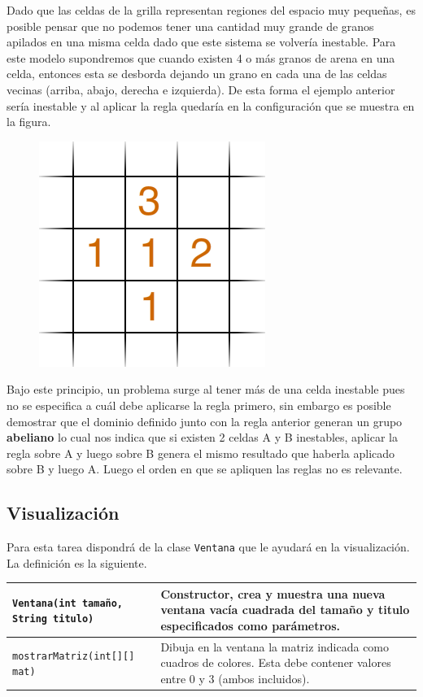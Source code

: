 \documentclass[dcc]{fcfmcourse}
\begin{document}
Dado que las celdas de la grilla representan regiones del espacio muy pequeñas, es posible pensar que no podemos tener una cantidad muy grande de granos apilados en una misma celda dado que este sistema se volvería inestable. Para este modelo supondremos que cuando existen 4 o más granos de arena en una celda, entonces esta se desborda dejando un grano en cada una de las celdas vecinas (arriba, abajo, derecha e izquierda). De esta forma el ejemplo anterior sería inestable y al aplicar la regla quedaría en la configuración que se muestra en la figura.

\begin{figure}[!ht]
    \centering
    \includegraphics[scale=0.5]{imagenes/gridex2.png}
\end{figure}

\newpage
Bajo este principio, un problema surge al tener más de una celda inestable pues no se especifica a cuál debe aplicarse la regla primero, sin embargo es posible demostrar que el dominio definido junto con la regla anterior generan un grupo \textbf{abeliano} lo cual nos indica que si existen 2 celdas A y B inestables, aplicar la regla sobre A y luego sobre B genera el mismo resultado que haberla aplicado sobre B y luego A. Luego el orden en que se apliquen las reglas no es relevante.


\subsection{Visualización}

Para esta tarea dispondrá de la clase \texttt{Ventana} que le ayudará en la visualización. La definición es la siguiente. \\

\def\arraystretch{1.8}
\begin{tabular}{|p{}|p{}|} \hline

\texttt{Ventana(int tamaño, String titulo)} & Constructor, crea y muestra una nueva ventana vacía cuadrada del tamaño y titulo especificados como parámetros. \\ \hline

\texttt{mostrarMatriz(int[][] mat)} & Dibuja en la ventana la matriz indicada como cuadros de colores. Esta debe contener valores entre 0 y 3 (ambos incluidos).
 \\ \hline
\end{tabular}
\end{document}
